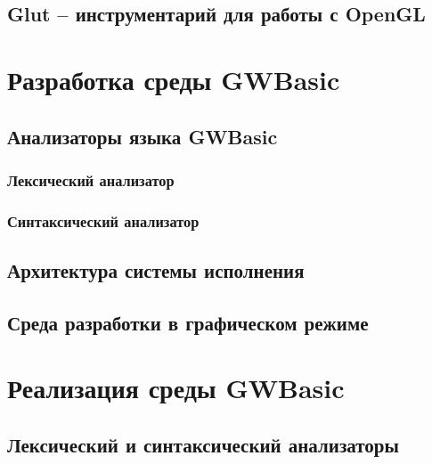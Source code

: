 \documentclass[12pt]{article}
\begin{document}
		\subsection{Glut -- инструментарий для работы с OpenGL}
	\newpage
	\section{Разработка среды GWBasic}
		\subsection{Анализаторы языка GWBasic}
			\subsubsection{Лексический анализатор}
			\subsubsection{Синтаксический анализатор}
		\subsection{Архитектура системы исполнения}
		\subsection{Среда разработки в графическом режиме}
	\newpage
	\section{Реализация среды GWBasic}
		\subsection{Лексический и синтаксический анализаторы}
\end{document}
